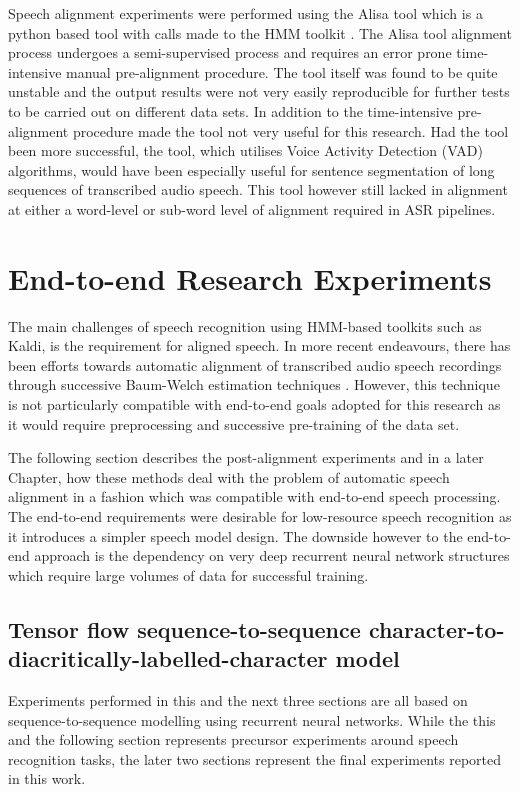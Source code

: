 Speech alignment experiments were performed using the Alisa \cite{stan2016alisa} tool which is a python based tool with calls made to the HMM toolkit \cite{young2002htk}.  The Alisa tool alignment process undergoes a semi-supervised process and requires an error prone time-intensive manual pre-alignment procedure.  The tool itself was found to be quite unstable and the output results were not very easily reproducible for further tests to be carried out on different data sets.  In addition to the time-intensive pre-alignment procedure made the tool not very useful for this research. Had the tool been more successful, the tool, which utilises Voice Activity Detection (VAD) algorithms, would have been especially useful for sentence segmentation of long sequences of transcribed audio speech.  This tool however still lacked in alignment at either a word-level or sub-word level of alignment required in ASR pipelines.

\section{End-to-end Research Experiments}\label{sec_postalign}
The main challenges of speech recognition using HMM-based toolkits such as Kaldi, is the requirement for aligned speech.  In more recent endeavours, there has been efforts towards automatic alignment of transcribed audio speech recordings through successive Baum-Welch estimation techniques \cite{gales2014speech,ragni2018automatic,ragni2014data}. However, this technique is not particularly compatible with end-to-end goals adopted for this research as it would require preprocessing and successive pre-training of the data set.

The following section describes the post-alignment experiments and in a later Chapter, how these methods deal with the problem of automatic speech alignment in a fashion which was compatible with end-to-end speech processing.  The end-to-end requirements were desirable for low-resource speech recognition as it introduces a simpler speech model design.  The downside however to the end-to-end approach is the dependency on very deep recurrent neural network structures which require large volumes of data for successful training.
\subsection{Tensor flow sequence-to-sequence character-to-diacritically-labelled-character model}\label{sec_c2d}
Experiments performed in this and the next three sections are all based on sequence-to-sequence modelling using recurrent neural networks. While the this and the following section represents precursor experiments around speech recognition tasks, the later two sections represent the final experiments reported in this work.


